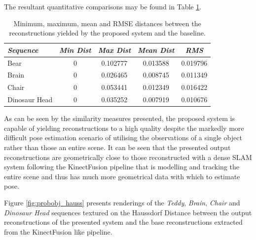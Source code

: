 The resultant quantitative comparisons may be found in Table \ref{tbl:probobj_hauss}.
\begin{table}[h]
  \label{tbl:probobj_hauss}
  \centering
  \begin{tabular}{lcccc}
    \emph{Sequence} & \emph{Min Dist} & \emph{Max Dist} & \emph{Mean Dist} & \emph{RMS}\\
    \midrule
    \textsf{Bear} & 0 & 0.102777 & 0.013588 & 0.019796 \\
    \textsf{Brain} & 0 & 0.026465 & 0.008745 & 0.011349 \\
    \textsf{Chair} & 0 & 0.053441 & 0.012349 & 0.016422 \\
    \textsf{Dinosaur Head} & 0 & 0.035252 & 0.007919 & 0.010676
  \end{tabular}
  \caption[Probabilistic Object Reconstruction Hausdorff Distance]
  {Minimum, maximum, mean and RMSE distances between the reconstructions yielded by 
  the proposed system and the baseline.}
\end{table}

As can be seen by the similarity measures presented, the proposed system is capable of 
yielding reconstructions to a high quality despite the markedly more difficult pose estimation 
scenario of utilising the observations of a single object rather than those an entire scene. 
It can be seen that the presented output reconstructions are geometrically close to those 
reconstructed with a dense SLAM system \cite{Prisacariu2014} following the KinectFusion 
\cite{Newcombe2011} pipeline that is modelling and tracking the entire scene and thus has 
much more geometrical data with which to estimate pose.

Figure \ref{fig:probobj_hauss} presents renderings of the \textit{Teddy}, 
\textit{Brain}, \textit{Chair} and \textit{Dinosaur Head} sequences textured 
on the Haussdorf Distance between the output reconstructions of the presented 
system and the base reconstructions extracted from the KinectFusion like pipeline.

